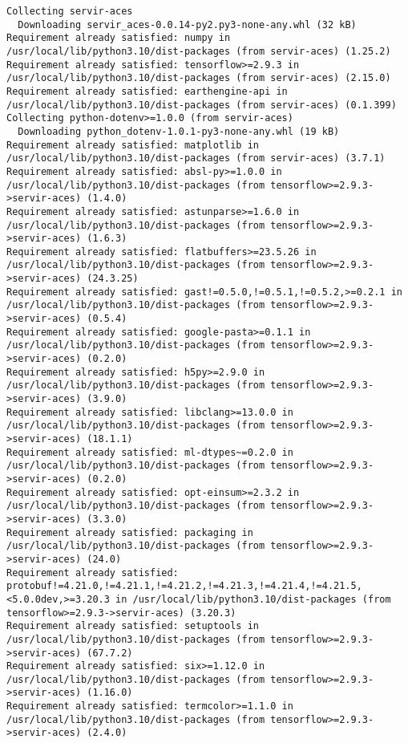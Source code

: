 \documentclass[
  letterpaper,
  DIV=11,
  numbers=noendperiod]{scrreprt}
\begin{document}
\begin{verbatim}
Collecting servir-aces
  Downloading servir_aces-0.0.14-py2.py3-none-any.whl (32 kB)
Requirement already satisfied: numpy in /usr/local/lib/python3.10/dist-packages (from servir-aces) (1.25.2)
Requirement already satisfied: tensorflow>=2.9.3 in /usr/local/lib/python3.10/dist-packages (from servir-aces) (2.15.0)
Requirement already satisfied: earthengine-api in /usr/local/lib/python3.10/dist-packages (from servir-aces) (0.1.399)
Collecting python-dotenv>=1.0.0 (from servir-aces)
  Downloading python_dotenv-1.0.1-py3-none-any.whl (19 kB)
Requirement already satisfied: matplotlib in /usr/local/lib/python3.10/dist-packages (from servir-aces) (3.7.1)
Requirement already satisfied: absl-py>=1.0.0 in /usr/local/lib/python3.10/dist-packages (from tensorflow>=2.9.3->servir-aces) (1.4.0)
Requirement already satisfied: astunparse>=1.6.0 in /usr/local/lib/python3.10/dist-packages (from tensorflow>=2.9.3->servir-aces) (1.6.3)
Requirement already satisfied: flatbuffers>=23.5.26 in /usr/local/lib/python3.10/dist-packages (from tensorflow>=2.9.3->servir-aces) (24.3.25)
Requirement already satisfied: gast!=0.5.0,!=0.5.1,!=0.5.2,>=0.2.1 in /usr/local/lib/python3.10/dist-packages (from tensorflow>=2.9.3->servir-aces) (0.5.4)
Requirement already satisfied: google-pasta>=0.1.1 in /usr/local/lib/python3.10/dist-packages (from tensorflow>=2.9.3->servir-aces) (0.2.0)
Requirement already satisfied: h5py>=2.9.0 in /usr/local/lib/python3.10/dist-packages (from tensorflow>=2.9.3->servir-aces) (3.9.0)
Requirement already satisfied: libclang>=13.0.0 in /usr/local/lib/python3.10/dist-packages (from tensorflow>=2.9.3->servir-aces) (18.1.1)
Requirement already satisfied: ml-dtypes~=0.2.0 in /usr/local/lib/python3.10/dist-packages (from tensorflow>=2.9.3->servir-aces) (0.2.0)
Requirement already satisfied: opt-einsum>=2.3.2 in /usr/local/lib/python3.10/dist-packages (from tensorflow>=2.9.3->servir-aces) (3.3.0)
Requirement already satisfied: packaging in /usr/local/lib/python3.10/dist-packages (from tensorflow>=2.9.3->servir-aces) (24.0)
Requirement already satisfied: protobuf!=4.21.0,!=4.21.1,!=4.21.2,!=4.21.3,!=4.21.4,!=4.21.5,<5.0.0dev,>=3.20.3 in /usr/local/lib/python3.10/dist-packages (from tensorflow>=2.9.3->servir-aces) (3.20.3)
Requirement already satisfied: setuptools in /usr/local/lib/python3.10/dist-packages (from tensorflow>=2.9.3->servir-aces) (67.7.2)
Requirement already satisfied: six>=1.12.0 in /usr/local/lib/python3.10/dist-packages (from tensorflow>=2.9.3->servir-aces) (1.16.0)
Requirement already satisfied: termcolor>=1.1.0 in /usr/local/lib/python3.10/dist-packages (from tensorflow>=2.9.3->servir-aces) (2.4.0)

\end{verbatim}
\end{document}
